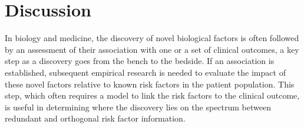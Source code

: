 \documentclass[12pt]{article}
\begin{document}







\vskip 0.50in

\section{Discussion} 

\noindent In biology and medicine, the discovery of novel biological factors is often followed by an assessment of their association with one or a set of clinical outcomes, a key step as a discovery goes from the bench to the bedside.  If an association is established,  subsequent empirical research is needed to evaluate the impact of these novel factors relative to known risk factors in the patient population.  This step, which often requires a model to link the risk factors to the clinical outcome, is useful in determining where the discovery lies on the spectrum between redundant and orthogonal risk factor information.
\end{document}
